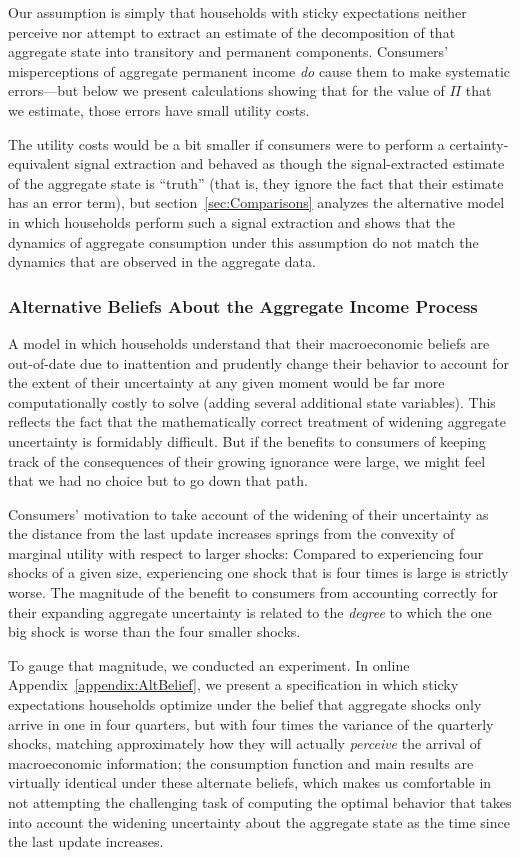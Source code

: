 \documentclass[titlepage]{./econtex}
\begin{document}
Our assumption is simply that households with sticky expectations neither perceive nor attempt to extract an estimate of the decomposition of that aggregate state into transitory and permanent components.  Consumers' misperceptions of aggregate permanent income \textit{do} cause them to make systematic errors---but below we present calculations showing that for the value of $\Pi$ that we estimate, those errors have small utility costs.

The utility costs would be a bit smaller if consumers were to perform a certainty-equivalent signal extraction and behaved as though the signal-extracted estimate of the aggregate state is ``truth'' (that is, they ignore the fact that their estimate has an error term), but section~\ref{sec:Comparisons} analyzes the alternative model in which households perform such a signal extraction and shows that the dynamics of aggregate consumption under this assumption do not match the dynamics that are observed in the aggregate data.

\subsubsection{Alternative Beliefs About the Aggregate Income Process}
A model in which households understand that their macroeconomic beliefs are out-of-date due to inattention and prudently change their behavior to account for the extent of their uncertainty at any given moment would be far more computationally costly to solve (adding several additional state variables).  This reflects the fact that the mathematically correct treatment of widening aggregate uncertainty is formidably difficult.  But if the benefits to consumers of keeping track of the consequences of their growing ignorance were large, we might feel that we had no choice but to go down that path.

Consumers' motivation to take account of the widening of their uncertainty as the distance from the last update increases springs from the convexity of marginal utility with respect to larger shocks: Compared to experiencing four shocks of a given size, experiencing one shock that is four times is large is strictly worse.  The magnitude of the benefit to consumers from accounting correctly for their expanding aggregate uncertainty is related to the \textit{degree} to which the one big shock is worse than the four smaller shocks.

To gauge that magnitude, we conducted an experiment.  In online Appendix~\ref{appendix:AltBelief}, we present a specification in which sticky expectations households optimize under the belief that aggregate shocks only arrive in one in four quarters, but with four times the variance of the quarterly shocks, matching approximately how they will actually \textit{perceive} the arrival of macroeconomic information; the consumption function and main results are virtually identical under these alternate beliefs, which makes us comfortable in not attempting the challenging task of computing the optimal behavior that takes into account the widening uncertainty about the aggregate state as the time since the last update increases.
\end{document}
